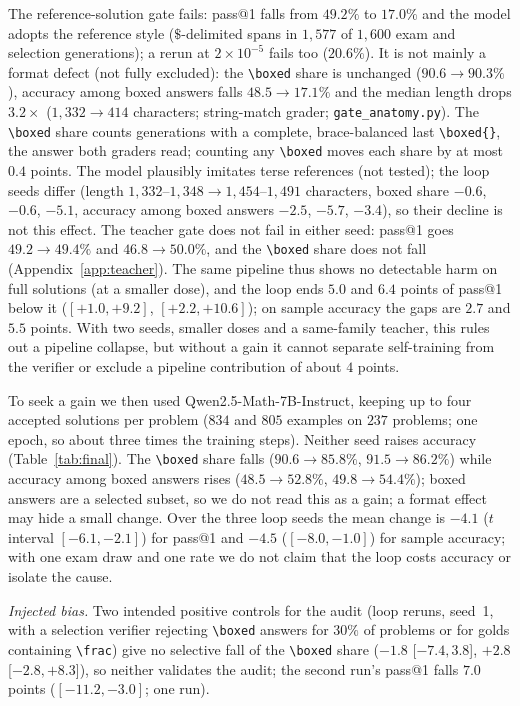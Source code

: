 \documentclass[runningheads]{llncs}
\begin{document}
The reference-solution gate fails: pass@1 falls from $49.2\%$ to $17.0\%$ and the model adopts the
reference style ($\$$-delimited spans in $1{,}577$ of $1{,}600$ exam and selection generations); a rerun at
$2\times10^{-5}$ fails too ($20.6\%$). It is not mainly a format defect (not fully excluded): the \verb|\boxed|
share is unchanged ($90.6\to90.3\%$), accuracy among boxed answers falls $48.5\to17.1\%$ and the median length drops
$3.2\times$ ($1{,}332\to414$ characters; string-match grader; \texttt{gate\_anatomy.py}). The \verb|\boxed| share counts generations with a complete, brace-balanced last \verb|\boxed{}|, the answer both graders read; counting any \verb|\boxed| moves each share by at most $0.4$ points. The model plausibly imitates
terse references (not tested); the loop seeds differ (length $1{,}332$--$1{,}348\to1{,}454$--$1{,}491$
characters, boxed share $-0.6$, $-0.6$, $-5.1$, accuracy among boxed answers $-2.5$, $-5.7$, $-3.4$), so their decline is not
this effect. The teacher gate does not fail in either seed: pass@1 goes $49.2\to49.4\%$ and $46.8\to50.0\%$, and the \verb|\boxed| share does not fall (Appendix~\ref{app:teacher}). The same pipeline thus shows no detectable harm on full solutions (at a smaller dose), and the loop ends $5.0$ and $6.4$ points of pass@1 below it ($[+1.0,+9.2]$, $[+2.2,+10.6]$); on sample accuracy the gaps are $2.7$ and $5.5$ points. With two seeds, smaller doses and a same-family teacher, this rules out a pipeline collapse, but without a gain it cannot separate self-training from the verifier or exclude a pipeline contribution of about $4$ points.

To seek a gain we then used Qwen2.5-Math-7B-Instruct, keeping up to four accepted solutions per problem ($834$ and $805$ examples on $237$ problems; one epoch, so about three times the training steps). Neither seed raises accuracy (Table~\ref{tab:final}). The \verb|\boxed| share falls ($90.6\to85.8\%$, $91.5\to86.2\%$) while accuracy among boxed answers rises ($48.5\to52.8\%$, $49.8\to54.4\%$); boxed answers are a selected subset, so we do not read this as a gain; a format effect may hide a small change.
Over the three loop seeds the mean change is $-4.1$ ($t$ interval
$[-6.1,-2.1]$) for pass@1 and $-4.5$ ($[-8.0,-1.0]$) for sample accuracy; with one exam draw and one rate we do
not claim that the loop costs accuracy or isolate the cause.

\emph{Injected bias.} Two intended positive controls for the audit (loop reruns, seed~1, with a selection verifier rejecting \verb|\boxed| answers for $30\%$ of problems or for golds containing \verb|\frac|) give no selective fall of the \verb|\boxed| share ($-1.8$ [$-7.4,3.8$], $+2.8$ [$-2.8,+8.3$]), so neither validates the audit; the second run's pass@1 falls $7.0$ points ($[-11.2,-3.0]$; one run).
\end{document}
